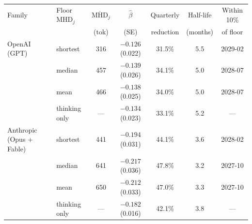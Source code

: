 \begin{tabular}{llccccc}
\toprule
Family & Floor $\mathrm{MHD}_j$ & $\overline{\mathrm{MHD}}_j$ & $\hat\beta$ & Quarterly & Half-life & Within 10\% \\
 & & (tok) & (SE) & reduction & (months) & of floor \\
\midrule
OpenAI (GPT) & shortest & 316 & $-0.126$ (0.022) & 31.5\% & 5.5 & 2029-02 \\
 & median & 457 & $-0.139$ (0.026) & 34.1\% & 5.0 & 2028-07 \\
 & mean & 466 & $-0.138$ (0.025) & 34.0\% & 5.0 & 2028-07 \\
\addlinespace
 & thinking only & --- & $-0.134$ (0.023) & 33.1\% & 5.2 & --- \\
\midrule
Anthropic (Opus + Fable) & shortest & 441 & $-0.194$ (0.031) & 44.1\% & 3.6 & 2028-02 \\
 & median & 641 & $-0.217$ (0.036) & 47.8\% & 3.2 & 2027-10 \\
 & mean & 650 & $-0.212$ (0.033) & 47.0\% & 3.3 & 2027-10 \\
\addlinespace
 & thinking only & --- & $-0.182$ (0.016) & 42.1\% & 3.8 & --- \\
\bottomrule
\end{tabular}
